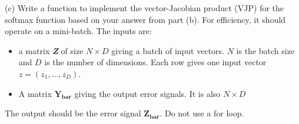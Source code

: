 \documentclass[12pt]{article}%
\begin{document}
(c) Write a function to implement the vector-Jacobian product (VJP) for the
softmax function based on your answer from part (b). For efficiency, it should
operate on a mini-batch.
The inputs are:
\begin{itemize}
    \item a matrix \textit{\textbf{Z}} of size $N \times D$ giving a batch of input vectors. $N$ is the batch
size and $D$ is the number of dimensions. Each row gives one input vector
$z = (z_1, \dots , z_D)$.
    \item A matrix $\mathbf{Y_{bar}}$ giving the output error signals. It is also $N \times D$
\end{itemize} 
\indent The output should be the error signal $\mathbf{Z_{bar}}$. Do not use a for loop.
 





\end{document}
